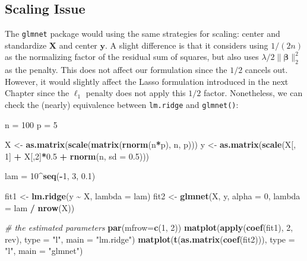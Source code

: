 \documentclass[
]{book}
\newenvironment{Shaded}{\begin{snugshade}}{\end{snugshade}}
\newcommand{\AttributeTok}[1]{\textcolor[rgb]{0.13,0.29,0.53}{#1}}
\newcommand{\CommentTok}[1]{\textcolor[rgb]{0.56,0.35,0.01}{\textit{#1}}}
\newcommand{\DecValTok}[1]{\textcolor[rgb]{0.00,0.00,0.81}{#1}}
\newcommand{\FloatTok}[1]{\textcolor[rgb]{0.00,0.00,0.81}{#1}}
\newcommand{\FunctionTok}[1]{\textcolor[rgb]{0.13,0.29,0.53}{\textbf{#1}}}
\newcommand{\NormalTok}[1]{#1}
\newcommand{\OtherTok}[1]{\textcolor[rgb]{0.56,0.35,0.01}{#1}}
\newcommand{\SpecialCharTok}[1]{\textcolor[rgb]{0.81,0.36,0.00}{\textbf{#1}}}
\newcommand{\StringTok}[1]{\textcolor[rgb]{0.31,0.60,0.02}{#1}}
\theoremstyle{definition}
\theoremstyle{definition}
\theoremstyle{definition}
\theoremstyle{definition}
\theoremstyle{remark}
\begin{document}
\hypertarget{scaling-issue-1}{%
\subsection{Scaling Issue}\label{scaling-issue-1}}

The \texttt{glmnet} package would using the same strategies for scaling: center and standardize \(\mathbf{X}\) and center \(\mathbf{y}\). A slight difference is that it considers using \(1/(2n)\) as the normalizing factor of the residual sum of squares, but also uses \(\lambda/2 \lVert \boldsymbol \beta\rVert_2^2\) as the penalty. This does not affect our formulation since the \(1/2\) cancels out. However, it would slightly affect the Lasso formulation introduced in the next Chapter since the \(\ell_1\) penalty does not apply this \(1/2\) factor. Nonetheless, we can check the (nearly) equivalence between \texttt{lm.ridge} and \texttt{glmnet()}:

\begin{Shaded}
\begin{Highlighting}[]
\NormalTok{  n }\OtherTok{=} \DecValTok{100}
\NormalTok{  p }\OtherTok{=} \DecValTok{5}

\NormalTok{  X }\OtherTok{\textless{}{-}} \FunctionTok{as.matrix}\NormalTok{(}\FunctionTok{scale}\NormalTok{(}\FunctionTok{matrix}\NormalTok{(}\FunctionTok{rnorm}\NormalTok{(n}\SpecialCharTok{*}\NormalTok{p), n, p)))}
\NormalTok{  y }\OtherTok{\textless{}{-}} \FunctionTok{as.matrix}\NormalTok{(}\FunctionTok{scale}\NormalTok{(X[, }\DecValTok{1}\NormalTok{] }\SpecialCharTok{+}\NormalTok{ X[,}\DecValTok{2}\NormalTok{]}\SpecialCharTok{*}\FloatTok{0.5} \SpecialCharTok{+} \FunctionTok{rnorm}\NormalTok{(n, }\AttributeTok{sd =} \FloatTok{0.5}\NormalTok{)))}
 
\NormalTok{  lam }\OtherTok{=} \DecValTok{10}\SpecialCharTok{\^{}}\FunctionTok{seq}\NormalTok{(}\SpecialCharTok{{-}}\DecValTok{1}\NormalTok{, }\DecValTok{3}\NormalTok{, }\FloatTok{0.1}\NormalTok{)}
 
\NormalTok{  fit1 }\OtherTok{\textless{}{-}} \FunctionTok{lm.ridge}\NormalTok{(y }\SpecialCharTok{\textasciitilde{}}\NormalTok{ X, }\AttributeTok{lambda =}\NormalTok{ lam)}
\NormalTok{  fit2 }\OtherTok{\textless{}{-}} \FunctionTok{glmnet}\NormalTok{(X, y, }\AttributeTok{alpha =} \DecValTok{0}\NormalTok{, }\AttributeTok{lambda =}\NormalTok{ lam }\SpecialCharTok{/} \FunctionTok{nrow}\NormalTok{(X))}
 
  \CommentTok{\# the estimated parameters}
  \FunctionTok{par}\NormalTok{(}\AttributeTok{mfrow=}\FunctionTok{c}\NormalTok{(}\DecValTok{1}\NormalTok{, }\DecValTok{2}\NormalTok{))}
  \FunctionTok{matplot}\NormalTok{(}\FunctionTok{apply}\NormalTok{(}\FunctionTok{coef}\NormalTok{(fit1), }\DecValTok{2}\NormalTok{, rev), }\AttributeTok{type =} \StringTok{"l"}\NormalTok{, }\AttributeTok{main =} \StringTok{"lm.ridge"}\NormalTok{)}
  \FunctionTok{matplot}\NormalTok{(}\FunctionTok{t}\NormalTok{(}\FunctionTok{as.matrix}\NormalTok{(}\FunctionTok{coef}\NormalTok{(fit2))), }\AttributeTok{type =} \StringTok{"l"}\NormalTok{, }\AttributeTok{main =} \StringTok{"glmnet"}\NormalTok{)}
\end{Highlighting}
\end{Shaded}
\end{document}
